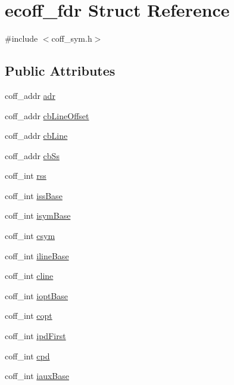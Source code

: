 \hypertarget{structecoff__fdr}{
\section{ecoff\_\-fdr Struct Reference}
\label{structecoff__fdr}
}


{\ttfamily \#include $<$coff\_\-sym.h$>$}

\subsection*{Public Attributes}
\begin{DoxyCompactItemize}
\item 
coff\_\-addr \hyperlink{structecoff__fdr_a65cac13be29242a157093f41d5166c5e}{adr}
\item 
coff\_\-addr \hyperlink{structecoff__fdr_a51eaf945057b46b977e6b232502b8120}{cbLineOffset}
\item 
coff\_\-addr \hyperlink{structecoff__fdr_ac184e88b60679333ddf91d564011cd07}{cbLine}
\item 
coff\_\-addr \hyperlink{structecoff__fdr_a9360bda468013f9e5bdfbf5fad2736d3}{cbSs}
\item 
coff\_\-int \hyperlink{structecoff__fdr_a6a3dca809302b75535424ba06958ed4b}{rss}
\item 
coff\_\-int \hyperlink{structecoff__fdr_a0995dfb1f9c6dcdd81af6fdf5bcb6264}{issBase}
\item 
coff\_\-int \hyperlink{structecoff__fdr_ac7196779a074326d344483d9222dae87}{isymBase}
\item 
coff\_\-int \hyperlink{structecoff__fdr_a9f20c6ece82136e6b8627f05293e2677}{csym}
\item 
coff\_\-int \hyperlink{structecoff__fdr_a4c368871fb2f1d88d3e96339df96d722}{ilineBase}
\item 
coff\_\-int \hyperlink{structecoff__fdr_aacfb51586ffae1a3d43e9eb783e9cd55}{cline}
\item 
coff\_\-int \hyperlink{structecoff__fdr_a5cb18574ecef7e5236d540f3ee8c6419}{ioptBase}
\item 
coff\_\-int \hyperlink{structecoff__fdr_a64f5f4261253b4e22909009c800a57b8}{copt}
\item 
coff\_\-int \hyperlink{structecoff__fdr_aa5b194fca41fddc29b3f834daf35ebb0}{ipdFirst}
\item 
coff\_\-int \hyperlink{structecoff__fdr_a902f203af4593121a0cc004f5cd6ac80}{cpd}
\item 
coff\_\-int \hyperlink{structecoff__fdr_a7aa784a315db8c0539ebb2b23739e62a}{iauxBase}

\end{DoxyCompactItemize}
